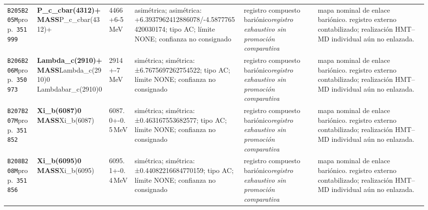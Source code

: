 \begin{landscape}
\begin{longtable}{L{1.85cm}L{4.45cm}L{2.35cm}L{4.05cm}L{3.35cm}L{7.15cm}}
\texttt{B205}\newline \texttt{B205M}\newline prop.\ \texttt{351999} & \textbf{P\_\allowbreak{}c\_\allowbreak{}cbar(4312)+ MASS}\newline P\_\allowbreak{}c\_\allowbreak{}cbar(4312)+ & 4466+6-5\,MeV & asimétrica; asimétrica: +6.3937962412886078/-4.5877765420030174; tipo AC; límite NONE; confianza no consignado & registro compuesto bariónico\newline \emph{registro exhaustivo sin promoción comparativa} & mapa nominal de enlace bariónico. registro externo contabilizado; realización HMT--MD individual aún no enlazada. \\
\texttt{B206}\newline \texttt{B206M}\newline prop.\ \texttt{350973} & \textbf{Lambda\_\allowbreak{}c(2910)+ MASS}\newline Lambda\_\allowbreak{}c(2910)0 \textbar{}\allowbreak{} Lambdabar\_\allowbreak{}c(2910)0 & 2914+-7\,MeV & simétrica; simétrica: ±6.7675697262754522; tipo AC; límite NONE; confianza no consignado & registro compuesto bariónico\newline \emph{registro exhaustivo sin promoción comparativa} & mapa nominal de enlace bariónico. registro externo contabilizado; realización HMT--MD individual aún no enlazada. \\
\texttt{B207}\newline \texttt{B207M}\newline prop.\ \texttt{351852} & \textbf{Xi\_\allowbreak{}b(6087)0 MASS}\newline Xi\_\allowbreak{}b(6087) & 6087.0+-0.5\,MeV & simétrica; simétrica: ±0.463167553682577; tipo AC; límite NONE; confianza no consignado & registro compuesto bariónico\newline \emph{registro exhaustivo sin promoción comparativa} & mapa nominal de enlace bariónico. registro externo contabilizado; realización HMT--MD individual aún no enlazada. \\
\texttt{B208}\newline \texttt{B208M}\newline prop.\ \texttt{351856} & \textbf{Xi\_\allowbreak{}b(6095)0 MASS}\newline Xi\_\allowbreak{}b(6095) & 6095.1+-0.4\,MeV & simétrica; simétrica: ±0.44082216684770159; tipo AC; límite NONE; confianza no consignado & registro compuesto bariónico\newline \emph{registro exhaustivo sin promoción comparativa} & mapa nominal de enlace bariónico. registro externo contabilizado; realización HMT--MD individual aún no enlazada. \\

\end{longtable}
\end{landscape}
